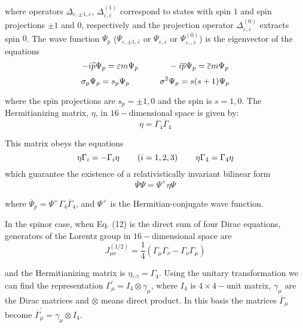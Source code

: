 \documentclass[a4paper,12pt]{article}
\begin{document}
where operators $\Delta _{\varepsilon ,\pm 1,\overline{\varepsilon
}}$, $ \Delta _{\varepsilon ,\overline{\varepsilon }}^{(1)}$
correspond to states with spin $1$ and spin projections $\pm 1$
and $0$, respectively and the projection operator $\Delta
_{\varepsilon ,\overline{\varepsilon }}^{(0)}$ extracts spin $0$.
The wave function $\Psi _p$ ($\Psi _{\varepsilon ,\pm 1,
\overline{\varepsilon }}$ or $\Psi _{\varepsilon
,\overline{\varepsilon }}$ or $\Psi _{\varepsilon
,,\overline{\varepsilon }}^{(0)}$) is the eigenvector of the
equations
\[
-i\widehat{p}\Psi _p=\varepsilon m\Psi
_p\hspace{0.5in}-i\overline{p}\Psi _p= \overline{\varepsilon
}m\Psi _p
\]
\begin{equation}
\sigma _p\Psi _p=s_p\Psi _p\hspace{0.5in}\sigma ^2\Psi _p=s(s+1)\Psi _p
\label{34}
\end{equation}

where the spin projections are $s_p=\pm 1,0$ and the spin is $s=1,0$. The
Hermitianizing matrix, $\eta $, in $16-$dimensional space is given by:
\begin{equation}
\eta =\Gamma _4\overline{\Gamma }_4  \label{35}
\end{equation}

This matrix obeys the equations
\[
\eta \Gamma _i=-\Gamma _i\eta \hspace{0.3in}(i=1,2,3)\hspace{0.3in}\eta
\Gamma _4=\Gamma _4\eta
\]
which guarantee the existence of a relativistically invariant bilinear form
\begin{equation}
\overline{\Psi }\Psi =\Psi ^{+}\eta \Psi  \label{36}
\end{equation}

where $\overline{\Psi }_p=\Psi ^{+}\Gamma _4\overline{\Gamma }_4$, and $\Psi
^{+}$ is the Hermitian-conjugate wave function.

In the spinor case, when Eq. (12) is the direct sum of four Dirac equations,
generators of the Lorentz group in $16-$dimensional space are
\begin{equation}
J_{\mu \nu }^{(1/2)}=\frac 14\left( \Gamma _\mu \Gamma _\nu -\Gamma _\nu
\Gamma _\mu \right)  \label{37}
\end{equation}

and the Hermitianizing matrix is $\eta _{^{1/2}}=\Gamma _4$. Using the
unitary transformation we can find the representation $\Gamma _\mu ^{\prime
}=I_4\otimes \gamma _\mu $, where $I_4$ is $4\times 4-$unit matrix, $\gamma
_\mu $ are the Dirac matrices and $\otimes $ means direct product. In this
basis the matrices $\overline{\Gamma }_\mu $ become $\overline{\Gamma }_\mu
^{\prime }=\gamma _\mu \otimes I_4$.
\end{document}

